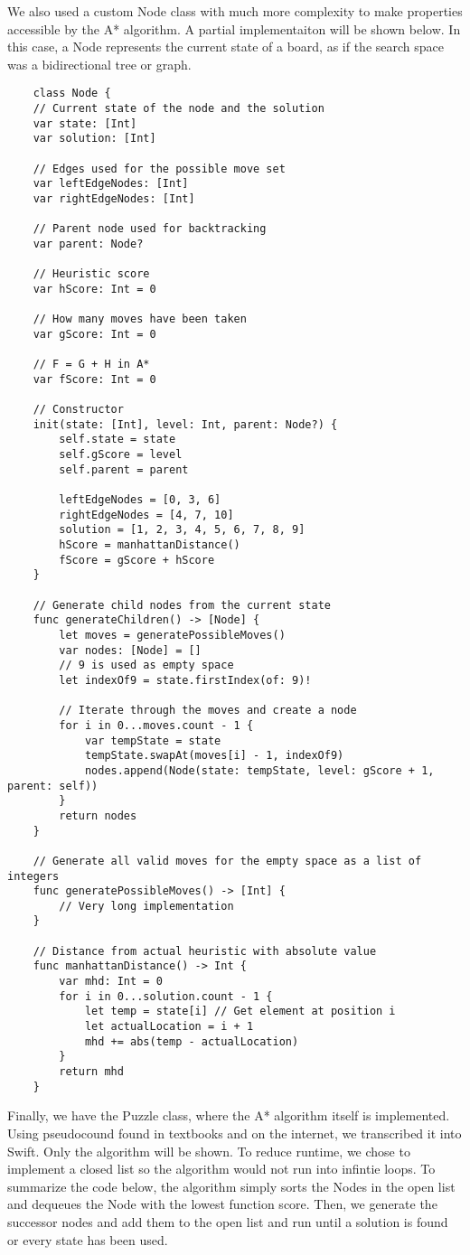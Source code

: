 \documentclass[titlepage]{article}
\begin{document}
We also used a custom Node class with much more complexity to make properties accessible by the A* algorithm. A partial implementaiton will be shown below. In this case, a Node represents the current state of a board, as if the search space was a bidirectional tree or graph.
\vspace{6mm}
\begin{lstlisting}
	class Node {
	// Current state of the node and the solution
	var state: [Int]
	var solution: [Int]
	
	// Edges used for the possible move set
	var leftEdgeNodes: [Int]
	var rightEdgeNodes: [Int]
	
	// Parent node used for backtracking
	var parent: Node?
	
	// Heuristic score
	var hScore: Int = 0
	
	// How many moves have been taken
	var gScore: Int = 0
	
	// F = G + H in A*
	var fScore: Int = 0
	
	// Constructor
	init(state: [Int], level: Int, parent: Node?) {
		self.state = state
		self.gScore = level
		self.parent = parent
		
		leftEdgeNodes = [0, 3, 6]
		rightEdgeNodes = [4, 7, 10]
		solution = [1, 2, 3, 4, 5, 6, 7, 8, 9]
		hScore = manhattanDistance()
		fScore = gScore + hScore
	}
	
	// Generate child nodes from the current state
	func generateChildren() -> [Node] {
		let moves = generatePossibleMoves()
		var nodes: [Node] = []
		// 9 is used as empty space
		let indexOf9 = state.firstIndex(of: 9)!
		
		// Iterate through the moves and create a node
		for i in 0...moves.count - 1 {
			var tempState = state
			tempState.swapAt(moves[i] - 1, indexOf9)
			nodes.append(Node(state: tempState, level: gScore + 1, parent: self))
		}
		return nodes
	}
	
	// Generate all valid moves for the empty space as a list of integers
	func generatePossibleMoves() -> [Int] {
		// Very long implementation
	}
	
	// Distance from actual heuristic with absolute value
	func manhattanDistance() -> Int {
		var mhd: Int = 0
		for i in 0...solution.count - 1 {
			let temp = state[i] // Get element at position i
			let actualLocation = i + 1
			mhd += abs(temp - actualLocation)
		}
		return mhd
	}
\end{lstlisting}
\vspace{6mm}
Finally, we have the Puzzle class, where the A* algorithm itself is implemented. Using pseudocound found in textbooks and on the internet, we transcribed it into Swift. Only the algorithm will be shown. To reduce runtime, we chose to implement a closed list so the algorithm would not run into infintie loops. To summarize the code below, the algorithm simply sorts the Nodes in the open list and dequeues the Node with the lowest function score. Then, we generate the successor nodes and add them to the open list and run until a solution is found or every state has been used. 
\end{document}
